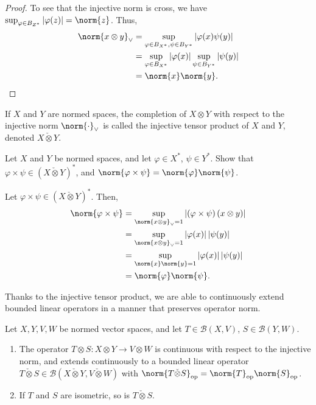 \documentclass[10pt]{mypackage}
\begin{document}
\begin{proof}
  To see that the injective norm is cross, we have $\sup_{\varphi\in B_{Z^{\ast}}}\left\vert \varphi(z) \right\vert = \norm{z}$. Thus,
  \begin{align*}
    \norm{x\otimes y}_{\vee} &= \sup_{\varphi\in B_{X^{\ast}},\psi\in B_{Y^{\ast}}}\left\vert \varphi(x)\psi(y) \right\vert\\
                             &= \sup_{\varphi\in B_{X^{\ast}}}\left\vert \varphi(x) \right\vert  \sup_{\psi\in B_{Y^{\ast}}}\left\vert \psi(y) \right\vert\\
                             &= \norm{x}\norm{y}.
  \end{align*}
\end{proof}
\begin{definition}
  If $X$ and $Y$ are normed spaces, the completion of $X\otimes Y$ with respect to the injective norm $\norm{\cdot}_{\vee}$ is called the injective tensor product of $X$ and $Y$, denoted $X\check{\otimes}Y$.
\end{definition}
\begin{exercise}
  Let $X$ and $Y$ be normed spaces, and let $\varphi\in X^{\ast}$, $\psi\in Y^{\ast}$. Show that $\varphi\times \psi\in \left(X\check{\otimes}Y\right)^{\ast}$, and $\norm{\varphi\times\psi} = \norm{\varphi}\norm{\psi}$.
\end{exercise}
\begin{solution}
  Let $\varphi\times \psi\in \left(X\check\otimes Y\right)^{\ast}$. Then,
  \begin{align*}
    \norm{\varphi\times\psi} &= \sup_{\norm{x\otimes y}_{\vee} = 1}\left\vert \left(\varphi\times\psi\right)\left(x\otimes y\right) \right\vert\\
                             &= \sup_{\norm{x\otimes y}_{\vee} = 1}\left\vert \varphi(x) \right\vert\left\vert \psi(y) \right\vert\\
                             &= \sup_{\norm{x}\norm{y} = 1}\left\vert \varphi(x) \right\vert\left\vert \psi(y) \right\vert\\
                             &= \norm{\varphi}\norm{\psi}.
  \end{align*}
\end{solution}
Thanks to the injective tensor product, we are able to continuously extend bounded linear operators in a manner that preserves operator norm.
\begin{proposition}
  Let $X,Y,V,W$ be normed vector spaces, and let $T\in \mathcal{B}\left(X,V\right)$, $S\in \mathcal{B}\left(Y,W\right)$.
  \begin{enumerate}[(1)]
    \item The operator $T\otimes S: X\otimes Y \rightarrow V\otimes W$ is continuous with respect to the injective norm, and extends continuously to a bounded linear operator $T\check\otimes S\in \mathcal{B}\left(X\check\otimes Y,V\check\otimes W\right)$ with $\norm{T\check\otimes S}_{\text{op}} = \norm{T}_{\text{op}}\norm{S}_{\text{op}}$.
    \item If $T$ and $S$ are isometric, so is $T\check\otimes S$.
  \end{enumerate}
\end{proposition}
\end{document}
